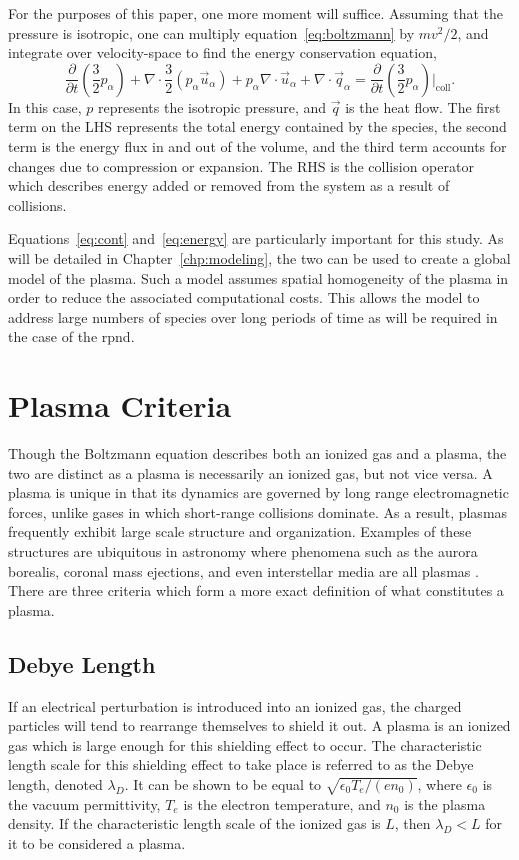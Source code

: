 For the purposes of this paper, one more moment will suffice. Assuming that the
pressure is isotropic, one can multiply equation~\ref{eq:boltzmann} by $mv^2/2$,
and integrate over velocity-space to find the energy conservation equation,
\begin{equation}
  \frac{\partial}{\partial t}\left(\frac{3}{2}p_\alpha\right) 
  + \nabla\cdot\frac{3}{2} (p_\alpha\vec{u}_\alpha)
  + p_\alpha\nabla\cdot\vec{u}_\alpha
  + \nabla\cdot\vec{q}_\alpha
  = \frac{\partial}{\partial
  t}\left(\frac{3}{2}p_\alpha\right)\bigg|_\mathrm{coll}.
  \label{eq:energy}
\end{equation}
In this case, $p$ represents the isotropic pressure, and $\vec{q}$ is the heat
flow. The first term on the LHS represents the total energy contained by the
species, the second term is the energy flux in and out of the volume, and the
third term accounts for changes due to compression or expansion. The RHS is the
collision operator which describes energy added or removed from the system as a
result of collisions.

Equations~\ref{eq:cont} and~\ref{eq:energy} are particularly important for this
study. As will be detailed in Chapter~\ref{chp:modeling}, the two can be used to
create a global model of the plasma. Such a model assumes spatial homogeneity of
the plasma in order to reduce the associated computational costs. This allows
the model to address large numbers of species over long periods of time as will
be required in the case of the \acs{rpnd}.

\section{Plasma Criteria}
Though the Boltzmann equation describes both an ionized gas and a plasma, the
two are distinct as a plasma is necessarily an ionized gas, but not vice versa.
A plasma is unique in that its dynamics are governed by long range
electromagnetic forces, unlike gases in which short-range collisions dominate.
As a result, plasmas frequently exhibit large scale structure and organization.
Examples of these structures are ubiquitous in astronomy where phenomena such as
the aurora borealis, coronal mass ejections, and even interstellar media are all
plasmas \cite{Chen1984}. There are three criteria which form a more exact
definition of what constitutes a plasma.

\subsection{Debye Length}
If an electrical perturbation is introduced into an ionized gas, the charged
particles will tend to rearrange themselves to shield it out. A plasma is an
ionized gas which is large enough for this shielding effect to occur. The
characteristic length scale for this shielding effect to take place is referred
to as the Debye length, denoted $\lambda_D$. It can be shown to be equal to
$\sqrt{\epsilon_0T_e/(en_0)}$, where $\epsilon_0$ is the vacuum permittivity,
$T_e$ is the electron temperature, and $n_0$ is the plasma density. If the
characteristic length scale of the ionized gas is $L$, then $\lambda_D < L$ for
it to be considered a plasma.

